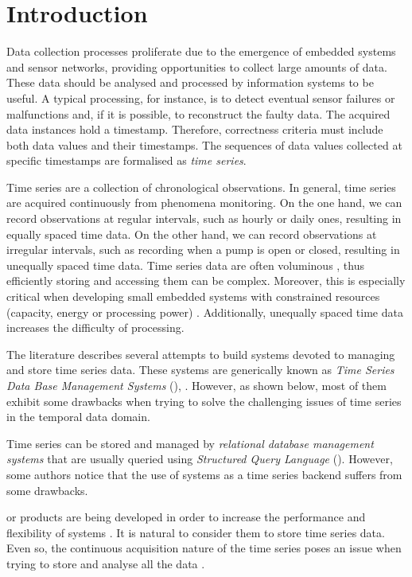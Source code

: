 \section{Introduction}

Data collection processes proliferate due to the emergence of embedded
systems and sensor networks, providing opportunities to collect large
amounts of data.  These data should be analysed and processed by
information systems to be useful. A typical processing, for instance,
is to detect eventual sensor failures or malfunctions and, if it is
possible, to reconstruct the faulty data. The acquired data instances
hold a timestamp. Therefore, correctness criteria must include both
data values and their timestamps. The sequences of data values
collected at specific timestamps are formalised as \emph{time series}.

Time series are a collection of chronological observations.  In
general, time series are acquired continuously from phenomena
monitoring. On the one hand, we can record observations at regular
intervals, such as hourly or daily ones, resulting in equally spaced
time data.  On the other hand, we can record observations at irregular
intervals, such as recording when a pump is open or closed, resulting
in unequally spaced time data. Time series data are often voluminous
\cite{fu11,keogh08:isax}, thus efficiently storing and accessing them
can be complex. Moreover, this is especially critical when developing
small embedded systems with constrained resources (capacity, energy or
processing power) \cite{yaogehrke02}. Additionally, unequally spaced
time data increases the difficulty of processing.

The literature describes several attempts to build systems devoted to
managing and store time series data. These systems are generically
known as \emph{Time Series Data Base Management Systems}
(), \cite{dreyer94,last01}. However, as shown below, most
of them exhibit some drawbacks when trying to solve the challenging
issues of time series in the temporal data domain.

Time series can be stored and managed by \emph{relational database
  management systems} that are usually queried using \emph{Structured
  Query Language} (). However, some authors
\cite{dreyer94,schmidt95,stonebraker09:scidb,zhang11} notice that the
use of  systems as a time series backend suffers from some
drawbacks.

 or  products are being developed in order to
increase the performance and flexibility of  systems
\cite{atzeni13:relational_model_dead,stonebraker10,stonebraker09:scidb,zhang11}. It
is natural to consider them to store time series data. Even so, the
continuous acquisition nature of the time series poses an issue when
trying to store and analyse all the data \cite{keogh97}.


